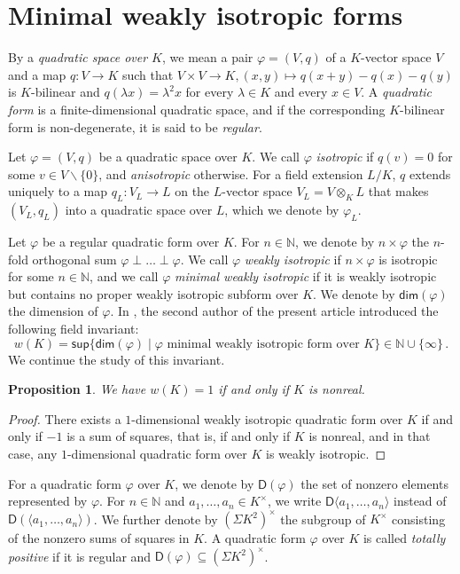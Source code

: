 \documentclass[twoside,11pt]{amsart}
\numberwithin{equation}{section}
\newtheorem{prop}[equation]{Proposition}
\theoremstyle{definition}
\renewcommand{\dim}{\operatorname{\mathsf{dim}}}
\newcommand{\vf}{\varphi}
\newcommand{\mg}[1]{{#1}^{\times}}
\newcommand{\nat}{\mathbb{N}}
\newcommand{\la}{\langle}
\newcommand{\ra}{\rangle}
\renewcommand{\setminus}{\smallsetminus}
\renewcommand{\dim}{\mathsf{dim}}
\renewcommand{\sup}{\mathsf{sup}}
\newcommand{\D}{\mathsf{D}}
\renewcommand{\setminus}{\smallsetminus}
\begin{document}
\section{Minimal weakly isotropic forms}

\label{S:mwif}

By a \emph{quadratic space over $K$}, we mean a pair $\vf=(V,q)$ of a $K$-vector space $V$ 
and a map $q:V\to K$ such that 
$V\times V\to K,(x,y)\mapsto q(x+y)-q(x)-q(y)$ is $K$-bilinear and  $q(\lambda x)=\lambda^2 x$ for every $\lambda\in K$ and every $x\in V$.
A \emph{quadratic form} is a finite-dimensional quadratic space, and if the corresponding $K$-bilinear form is non-degenerate, it is said to be \emph{regular}.

Let $\vf=(V,q)$ be a quadratic space over $K$.
We call $\vf$ \emph{isotropic} if $q(v)=0$ for some $v\in V\setminus\{0\}$, and \emph{anisotropic} otherwise.
    For a field extension $L/K$, $q$ extends uniquely to a map $q_L: V_L\to L$ on the $L$-vector space $V_L=V\otimes_KL$ that makes $(V_L,q_L)$ into a quadratic space over $L$, which we denote by $\vf_L$.
    
Let $\vf$ be a regular quadratic form over $K$. For $n\in\nat$, we denote by $n\times \vf$ the $n$-fold orthogonal sum $\vf\perp\ldots\perp\vf$. We call $\vf$ \emph{weakly isotropic} if $n\times \vf$ is isotropic for some $n\in\nat$, and we call $\vf$ \emph{minimal weakly isotropic} if it is weakly isotropic but contains no proper weakly isotropic subform over $K$.
We denote by $\dim(\vf)$ the dimension of $\vf$.
In \cite{Bec06}, the second author of the present article introduced the following field invariant:
$$w(K)=\sup \{\dim(\vf)\mid\vf \mbox{ minimal weakly isotropic form over }K\}\in \nat \cup \{\infty\}\,.$$
We continue the study of this invariant.

\begin{prop}\label{nr}
We have $w(K)=1$ if and only if $K$ is nonreal.
\end{prop}
\begin{proof}
There exists a $1$-dimensional weakly isotropic quadratic form over $K$ if and only if $-1$ is a sum of squares, that is, if and only if $K$ is nonreal, and in that case, any $1$-dimensional quadratic form over $K$ is weakly isotropic.
\end{proof}

For a quadratic form $\vf$ over $K$, we denote by $\D(\vf)$ the set of nonzero elements represented by $\vf$.
For $n\in\nat$ and $a_1,\dots,a_n\in\mg{K}$, we write $\D\la a_1,\dots,a_n\ra$ instead of $\D(\la a_1,\dots,a_n\ra)$.
We further denote by $\mg{(\mathsf{\Sigma}K^2)}$ the subgroup of $\mg{K}$ consisting of the nonzero sums of squares in $K$.
A quadratic form $\vf$ over $K$ is called \emph{totally positive} if it is regular and $\D(\vf)\subseteq \mg{(\mathsf{\Sigma}K^2)}$.
\end{document}
